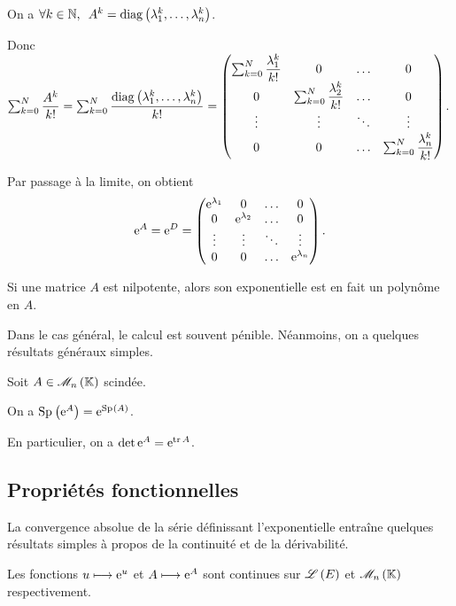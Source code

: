 \begin{dem}
On a \(\quantifs{\forall k\in\N}A^k=\diag{\lambda_1^k,\dots,\lambda_n^k}\).

Donc \(\sum_{k=0}^N\dfrac{A^k}{k!}=\sum_{k=0}^N\dfrac{\operatorname{diag}\left(\lambda_1^k,\dots,\lambda_n^k\right)}{k!}=\begin{pmatrix}
\sum_{k=0}^N\dfrac{\lambda_1^k}{k!} & 0 & \dots & 0 \\
0 & \sum_{k=0}^N\dfrac{\lambda_2^k}{k!} & \dots & 0 \\
\vdots & \vdots & \ddots & \vdots \\
0 & 0 & \dots & \sum_{k=0}^N\dfrac{\lambda_n^k}{k!}
\end{pmatrix}\).

Par passage à la limite, on obtient \[\mathrm{e}^{A}=\mathrm{e}^{D}=\begin{pmatrix}
\mathrm{e}^{\lambda_1} & 0 & \dots & 0 \\
0 & \mathrm{e}^{\lambda_2} & \dots & 0 \\
\vdots & \vdots & \ddots & \vdots \\
0 & 0 & \dots & \mathrm{e}^{\lambda_n}
\end{pmatrix}.\]
\end{dem}

Si une matrice \(A\) est nilpotente, alors son exponentielle est en fait un polynôme en \(A\).

Dans le cas général, le calcul est souvent pénible. Néanmoins, on a quelques résultats généraux simples.

\begin{prop}
Soit \(A\in\M{n}\) scindée.

On a \(\Sp{\e{A}}=\e{\Sp{A}}\).

En particulier, on a \(\det\mathrm{e}^{A}=\mathrm{e}^{\operatorname{tr} A}\).
\end{prop}

\subsection{Propriétés fonctionnelles}

La convergence absolue de la série définissant l'exponentielle entraîne quelques résultats simples à propos de la continuité et de la dérivabilité.

\begin{prop}
Les fonctions \(u\longmapsto\mathrm{e}^{u}\) et \(A\longmapsto\mathrm{e}^{A}\) sont continues sur \(\mathscr{L}\left(E\right)\) et \(\M{n}\) respectivement.
\end{prop}

